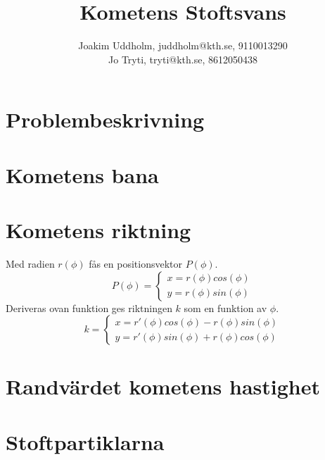 \documentclass[11pt,twoside]{article}
\title{Kometens Stoftsvans}
\author{Joakim Uddholm, juddholm@kth.se, 9110013290 \\
		Jo Tryti, tryti@kth.se, 8612050438}
\date{}
\begin{document}
\maketitle

\section{Problembeskrivning}


\section{Kometens bana}

\section{Kometens riktning}	
Med radien $r(\phi)$ fås en positionsvektor $P(\phi)$.
\begin{equation}
	P(\phi) = \begin{cases}
	x = r(\phi) cos(\phi) \\
	y = r(\phi) sin(\phi)
	\end{cases}
\end{equation}
Deriveras ovan funktion ges riktningen $k$ som en funktion av $\phi$. 
\begin{equation}
	k = \begin{cases}
	x = r'(\phi) cos(\phi) - r(\phi) sin(\phi) \\
	y = r'(\phi) sin(\phi) + r(\phi) cos(\phi)
	\end{cases}
\end{equation}

\section{Randvärdet kometens hastighet}



\section{Stoftpartiklarna}
\end{document}
